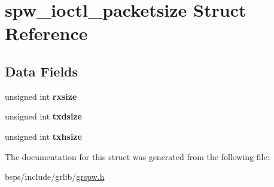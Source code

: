 \hypertarget{structspw__ioctl__packetsize}{}\section{spw\+\_\+ioctl\+\_\+packetsize Struct Reference}
\label{structspw__ioctl__packetsize}
\subsection*{Data Fields}
\begin{DoxyCompactItemize}
\item 
\mbox{\label{structspw__ioctl__packetsize_a86f693a5a6272144b3414144d28d714b}} 
unsigned int {\bfseries rxsize}
\item 
\mbox{\label{structspw__ioctl__packetsize_a453f02426a25af884ceda8adb80d87da}} 
unsigned int {\bfseries txdsize}
\item 
\mbox{\label{structspw__ioctl__packetsize_a1ec983bf55b0dde4407055d9fafb1ba1}} 
unsigned int {\bfseries txhsize}
\end{DoxyCompactItemize}


The documentation for this struct was generated from the following file\+:\begin{DoxyCompactItemize}
\item 
bsps/include/grlib/\mbox{\hyperlink{grspw_8h}{grspw.\+h}}\end{DoxyCompactItemize}
